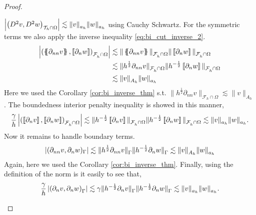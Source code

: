 \begin{proof}
\begin{enumerate}[label=\arabic*)]
                $\left\lvert \left( D^2 v, D^2w \right) _{\mathcal{T} _{h} \cap \Omega}   \right\rvert \lesssim \| v \|_{a_{h}  }^{  } \| w \|_{ a_{h} }^{  } $ using Cauchy Schwartz. For the symmetric terms we also apply the inverse inequality
                \eqref{eq:bi_cut_inverse_2}.
                \[
                    \begin{split}
                    \abs{\left( \mean{ \partial _{n n} v }, \jump{ \partial _{n}w }      \right)_{\mathcal{F}_{h}^{} \cap \Omega}  } & \lesssim  \|\mean{ \partial _{n n} v }  \|_{ \mathcal{F}_{h}^{} \cap \Omega}^{  }\|\jump{ \partial _{n} w }  \|_{
                    \mathcal{F}_{h}^{} \cap \Omega}^{  } \\
                    & \lesssim  \|h^{\frac{1}{2}} \partial _{n n} v  \|_{ \mathcal{F}_{h}^{} \cap \Omega}^{  }\| h^{-\frac{1}{2}} \jump{ \partial _{n} w }     \|_{\mathcal{F}_{h}^{} \cap \Omega}^{  } \\
                    & \lesssim  \| v \|_{A_{h}  }^{  } \|w    \|_{ a_{h}}^{  }
                    \end{split}
                \]
                Here we used the Corollary \ref{cor:bi_inverse_thm} s.t.  $\|h^{\frac{1}{2}} \partial _{n n}  v \|_{\mathcal{F}_{h}^{} \cap \Omega} \lesssim \| v \|_{ A_{h}  }^{  }  $.
              The boundedness interior penalty  inequality is showed in this manner, \[
             \frac{\gamma }{h} \abs{ \left( \jump{ \partial _{n} v}, \jump{ \partial _{n} w   }   \right)_{\mathcal{F}_{h}^{} \cap \Omega}  }  \lesssim  \|h^{-\frac{1}{2}} \jump{ \partial _{n} v}  \|_{ \mathcal{F}_{h}^{} \cap \Omega }^{  }
             \|h^{-\frac{1}{2}} \jump{ \partial _{n} w}  \|_{ \mathcal{F}_{h}^{} \cap \Omega }^{  }  \lesssim  \| v  \|_{ a_{h} }^{  }
             \| w  \|_{ a_{h} }^{  }.
             \]
              Now it remains to handle boundary terms. \[
                \left\lvert  ( \partial _{nn} v, \partial _{n} w)_{\Gamma }  \right\rvert  \lesssim \| h^{\frac{1}{2}}\partial _{nn} v \|_{\Gamma   }^{  } \| h^{-\frac{1}{2}} \partial _{n}w \|_{\Gamma   }^{  }  \lesssim \|  v \|_{A_{h}  }^{  } \| w \|_{ a_{h}   }^{  }
             \]
             Again, here we used the Corollary \ref{cor:bi_inverse_thm}.
             Finally, using the definition of the norm is it easily to see that,
             \[
\frac{\gamma }{h} \left\lvert  \left(  \partial _{n} v,  \partial _{n} w \right)_{\Gamma }   \right\rvert \lesssim \gamma  \| h^{-\frac{1}{2}} \partial _{n} v \|_{  \Gamma }^{  } \| h^{-\frac{1}{2}} \partial _{n} w \|_{\Gamma   }^{  } \lesssim \| v \|_{ a_{h} }^{  }
\| w \|_{ a_{h} }^{  } .
             \]


\end{enumerate}
\end{proof}
